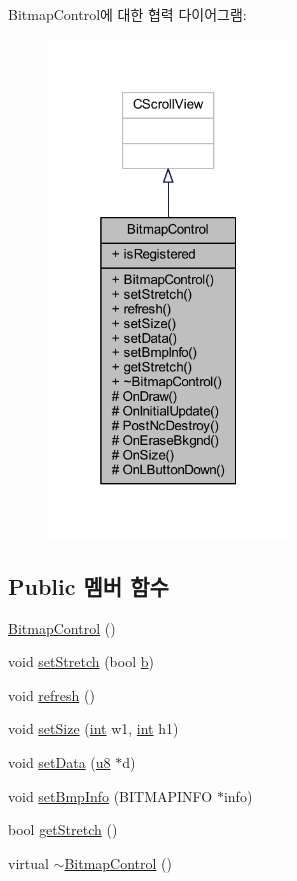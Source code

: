 Bitmap\+Control에 대한 협력 다이어그램\+:\nopagebreak
\begin{figure}[H]
\begin{center}
\leavevmode
\includegraphics[width=181pt]{class_bitmap_control__coll__graph}
\end{center}
\end{figure}
\subsection*{Public 멤버 함수}
\begin{DoxyCompactItemize}
\item 
\mbox{\hyperlink{class_bitmap_control_aec3c1d06a6cfc809eabfbd4217d90a8b}{Bitmap\+Control}} ()
\item 
void \mbox{\hyperlink{class_bitmap_control_ab545e15ea3edda9f0d80c0b8b0b7c812}{set\+Stretch}} (bool \mbox{\hyperlink{expr-lex_8cpp_a91b64995742fd30063314f12340b4b5a}{b}})
\item 
void \mbox{\hyperlink{class_bitmap_control_acf061a1e9a4cad90ad2827c14f79caa2}{refresh}} ()
\item 
void \mbox{\hyperlink{class_bitmap_control_a421004fe6ba01329dd69259396592d1f}{set\+Size}} (\mbox{\hyperlink{_util_8cpp_a0ef32aa8672df19503a49fab2d0c8071}{int}} w1, \mbox{\hyperlink{_util_8cpp_a0ef32aa8672df19503a49fab2d0c8071}{int}} h1)
\item 
void \mbox{\hyperlink{class_bitmap_control_aa6206183896caf192a37709fa5d7b8d2}{set\+Data}} (\mbox{\hyperlink{_system_8h_aed742c436da53c1080638ce6ef7d13de}{u8}} $\ast$d)
\item 
void \mbox{\hyperlink{class_bitmap_control_a301c52fc62de4368fccdcdc93cefad0b}{set\+Bmp\+Info}} (B\+I\+T\+M\+A\+P\+I\+N\+FO $\ast$info)
\item 
bool \mbox{\hyperlink{class_bitmap_control_a1d3cff9a3b57dd7558d678177dcf4b5c}{get\+Stretch}} ()
\item 
virtual \mbox{\hyperlink{class_bitmap_control_ae76af69d5ae1085e93213530ca913283}{$\sim$\+Bitmap\+Control}} ()
\end{DoxyCompactItemize}
